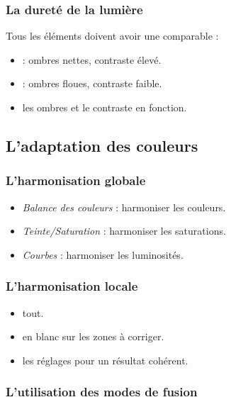 \subsubsection{La dureté de la lumière}

Tous les éléments doivent avoir une  comparable :

\begin{itemize}
    \item {} : ombres nettes, contraste élevé.
    \item {} : ombres floues, contraste faible.
    \item {} les ombres et le contraste en fonction.
\end{itemize}

\subsection{L'adaptation des couleurs}

\subsubsection{L'harmonisation globale}

\begin{itemize}
    \item {} \emph{Balance des couleurs} : harmoniser les couleurs.
    \item {} \emph{Teinte/Saturation} : harmoniser les saturations.
    \item {} \emph{Courbes} : harmoniser les luminosités.
\end{itemize}

\subsubsection{L'harmonisation locale}

\begin{itemize}
    \item {} tout.
    \item {} en blanc sur les zones à corriger.
    \item {} les réglages pour un résultat cohérent.
\end{itemize}

\subsubsection{L'utilisation des modes de fusion}

